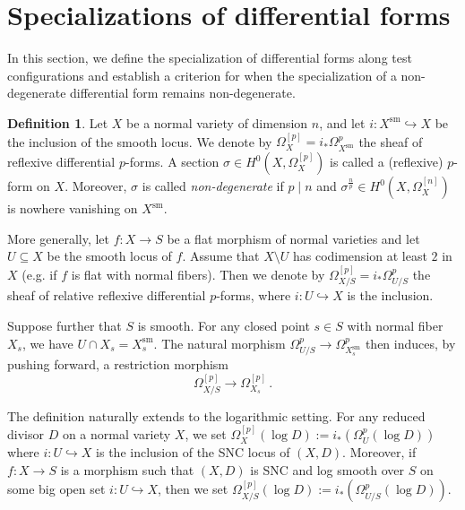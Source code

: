 \documentclass[12pt]{amsart}
\newtheorem{lem}[prop]{Lemma}
\theoremstyle{definition}
\newtheorem{defn}[prop]{Definition}
\newcommand{\bR}{\mathbb{R}}
\newcommand{\bT}{\mathbb{T}}
\newcommand{\Aut}{\mathrm{Aut}}
\newcommand{\wt}{\mathrm{wt}}
\numberwithin{equation}{section}
\begin{document}


\section{Specializations of differential forms}\label{s-differential forms}

In this section, we define the specialization of differential forms along test configurations and establish a criterion for when the specialization of a non-degenerate differential form remains non-degenerate.

\begin{defn}\label{defn:p-form}
Let $X$ be a normal variety of dimension $n$, and let $i\colon X^{\mathrm{sm}} \hookrightarrow X$ be the inclusion of the smooth locus. We denote by $\Omega^{[p]}_X = i_*\Omega^p_{X^{\mathrm{sm}}}$ the sheaf of reflexive differential $p$-forms. A section $\sigma \in H^0(X, \Omega^{[p]}_X)$ is called a (reflexive) $p$-form on $X$. Moreover, $\sigma$ is called \emph{non-degenerate} if $p \mid n$ and $\sigma^{\frac{n}{p}} \in H^0(X, \Omega^{[n]}_X)$ is nowhere vanishing on $X^{\mathrm{sm}}$.

More generally, let $f\colon X \to S$ be a flat morphism of normal varieties and let $U \subseteq X$ be the smooth locus of $f$. Assume that $X\setminus U$ has codimension at least $2$ in $X$ (e.g. if $f$ is flat with normal fibers). Then we denote by $\Omega^{[p]}_{X/S} = i_*\Omega^p_{U/S}$ the sheaf of relative reflexive differential $p$-forms, where $i\colon U \hookrightarrow X$ is the inclusion.

Suppose further that $S$ is smooth. For any closed point $s \in S$ with normal fiber $X_s$, we have $U \cap X_s = X_s^{\mathrm{sm}}$. The natural morphism $\Omega^p_{U/S} \to \Omega^p_{X_s^{\mathrm{sm}}}$ then induces, by pushing forward, a restriction morphism 
\begin{equation}\label{eq:forms restriction}
\Omega^{[p]}_{X/S} \to \Omega^{[p]}_{X_s}\,.
\end{equation}

The definition naturally extends to the logarithmic setting. For any reduced divisor $D$ on a normal variety $X$, we set $\Omega^{[p]}_X (\log D) := i_*(\Omega^p_{U}(\log D))$ where $i\colon U\hookrightarrow X$ is the inclusion of the SNC locus of $(X,D)$. Moreover, if $f\colon X\to S$ is a morphism such that $(X,D)$ is SNC and log smooth over $S$ on some big open set $i\colon U \hookrightarrow X$, then we set $\Omega^{[p]}_{X/S}(\log D):=i_*(\Omega^p_{U/S}(\log D))$.
\end{defn}
\end{document}
